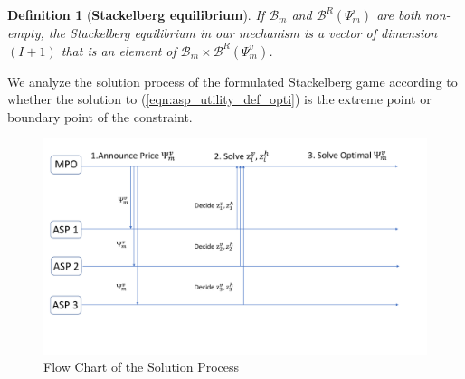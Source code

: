 \documentclass[conference]{IEEEtran}
\newtheorem{definition}{Definition}
\begin{document}
\begin{definition}[\textbf{Stackelberg equilibrium}] \label{def:stackelberg_equilibrium}
If $\mathcal{B}_{m}$ and $\mathcal{B}^R(\Psi_m^v)$ are both non-empty, the Stackelberg equilibrium in our mechanism is a vector of dimension $(I+1)$ that is an element of $\mathcal{B}_m  \times \mathcal{B}^R(\Psi_m^v)$.
\end{definition}
We analyze the solution process of the formulated Stackelberg game according to whether the solution to (\ref{eqn:asp_utility_def_opti}) is the extreme point or boundary point of the constraint.
\begin{figure}[!ht]
    \centering
    \includegraphics[width=\columnwidth]{5GDDoS_Game_Flow_Chart.pdf}
    \caption{Flow Chart of the Solution Process}
    \label{fig:flow_chart}
\end{figure}
\end{document}
